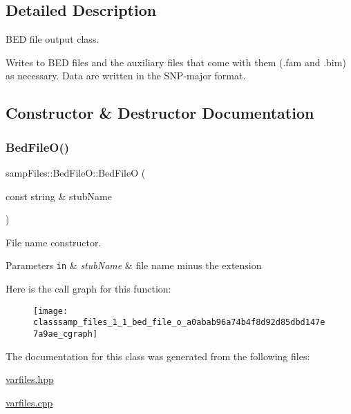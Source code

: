 \subsection{Detailed Description}
B\+ED file output class. 

Writes to B\+ED files and the auxiliary files that come with them (.fam and .bim) as necessary. Data are written in the S\+N\+P-\/major format. 

\subsection{Constructor \& Destructor Documentation}
\mbox{\label{classsamp_files_1_1_bed_file_o_a0abab96a74b4f8d92d85dbd147e7a9ae}} 
\subsubsection{\texorpdfstring{Bed\+File\+O()}{BedFileO()}}
{\footnotesize\ttfamily samp\+Files\+::\+Bed\+File\+O\+::\+Bed\+FileO (\begin{DoxyParamCaption}\item[{const string \&}]{stub\+Name }\end{DoxyParamCaption})\hspace{0.3cm}{\ttfamily [inline]}}



File name constructor. 


\begin{DoxyParams}[1]{Parameters}
\mbox{\tt in}  & {\em stub\+Name} & file name minus the extension \\
\hline
\end{DoxyParams}
Here is the call graph for this function\+:\nopagebreak
\begin{figure}[H]
\begin{center}
\leavevmode
\texttt{[image: classsamp\_files\_1\_1\_bed\_file\_o\_a0abab96a74b4f8d92d85dbd147e7a9ae\_cgraph]}
\end{center}
\end{figure}


The documentation for this class was generated from the following files\+:\begin{DoxyCompactItemize}
\item 
\hyperlink{varfiles_8hpp}{varfiles.\+hpp}\item 
\hyperlink{varfiles_8cpp}{varfiles.\+cpp}\end{DoxyCompactItemize}
